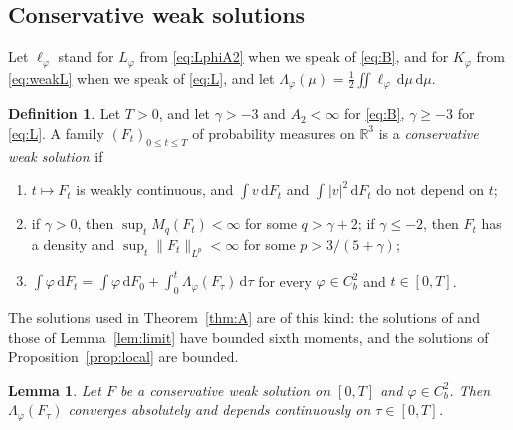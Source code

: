 \documentclass[11pt]{amsart}
\newtheorem{lemma}[theorem]{Lemma}
\theoremstyle{definition}
\newtheorem{definition}[theorem]{Definition}
\newcommand{\RR}{\mathbb{R}}
\newcommand{\dd}{\,\mathrm{d}}
\begin{document}
\subsection{Conservative weak solutions}
Let $\ell_\varphi$ stand for $L_\varphi$ from \eqref{eq:LphiA2} when we speak of \eqref{eq:B}, and for $K_\varphi$ from \eqref{eq:weakL} when we speak of \eqref{eq:L}, and let $\Lambda_\varphi(\mu)=\frac12\iint\ell_\varphi\dd\mu\dd\mu$.

\begin{definition}\label{def:weak}
Let $T>0$, and let $\gamma>-3$ and $A_2<\infty$ for \eqref{eq:B}, $\gamma\ge-3$ for \eqref{eq:L}. A family $(F_t)_{0\le t\le T}$ of probability measures on $\RR^3$ is a \emph{conservative weak solution} if
\begin{enumerate}
\item[(a)] $t\mapsto F_t$ is weakly continuous, and $\int v\dd F_t$ and $\int|v|^2\dd F_t$ do not depend on $t$;
\item[(b)] if $\gamma>0$, then $\sup_tM_q(F_t)<\infty$ for some $q>\gamma+2$; if $\gamma\le-2$, then $F_t$ has a density and $\sup_t\|F_t\|_{L^p}<\infty$ for some $p>3/(5+\gamma)$;
\item[(c)] $\int\varphi\dd F_t=\int\varphi\dd F_0+\int_0^t\Lambda_\varphi(F_\tau)\dd\tau$ for every $\varphi\in C^2_b$ and $t\in[0,T]$.
\end{enumerate}
\end{definition}

The solutions used in Theorem~\ref{thm:A} are of this kind: the solutions of \cite{MW99} and those of Lemma~\ref{lem:limit} have bounded sixth moments, and the solutions of Proposition~\ref{prop:local} are bounded.

\begin{lemma}\label{lem:tau}
Let $F$ be a conservative weak solution on $[0,T]$ and $\varphi\in C^2_b$. Then $\Lambda_\varphi(F_\tau)$ converges absolutely and depends continuously on $\tau\in[0,T]$.
\end{lemma}
\end{document}
